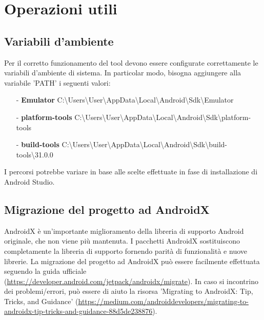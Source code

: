 \section*{Operazioni utili}

\subsection*{Variabili d'ambiente}
Per il corretto funzionamento del tool devono essere configurate correttamente le variabili d'ambiente di sistema. In particolar modo, bisogna aggiungere alla variabile 'PATH' i seguenti valori:
\begin{itemize}[nosep]
\item[-] \textbf{Emulator} C:\textbackslash Users\textbackslash User\textbackslash AppData\textbackslash Local\textbackslash Android\textbackslash Sdk\textbackslash Emulator
\item[-] \textbf{platform-tools} C:\textbackslash Users\textbackslash User\textbackslash AppData\textbackslash Local\textbackslash Android\textbackslash Sdk\textbackslash platform-tools 
\item[-] \textbf{build-tools} C:\textbackslash Users\textbackslash User\textbackslash AppData\textbackslash Local\textbackslash Android\textbackslash Sdk\textbackslash build-tools\textbackslash 31.0.0
\end{itemize}
\noindent I percorsi potrebbe variare in base alle scelte effettuate in fase di installazione di Android Studio.



\subsection*{Migrazione del progetto ad AndroidX}
AndroidX è un'importante miglioramento della libreria di supporto Android originale, che non viene più mantenuta. I pacchetti AndroidX sostituiscono completamente la libreria di supporto fornendo parità di funzionalità e nuove librerie. \newline
La migrazione del progetto ad AndroidX può essere facilmente effettuata seguendo la guida ufficiale (\url{https://developer.android.com/jetpack/androidx/migrate}). In caso si incontrino dei problemi/errori, può essere di aiuto la risorsa 'Migrating to AndroidX: Tip, Tricks, and Guidance' (\url{https://medium.com/androiddevelopers/migrating-to-androidx-tip-tricks-and-guidance-88d5de238876}).

